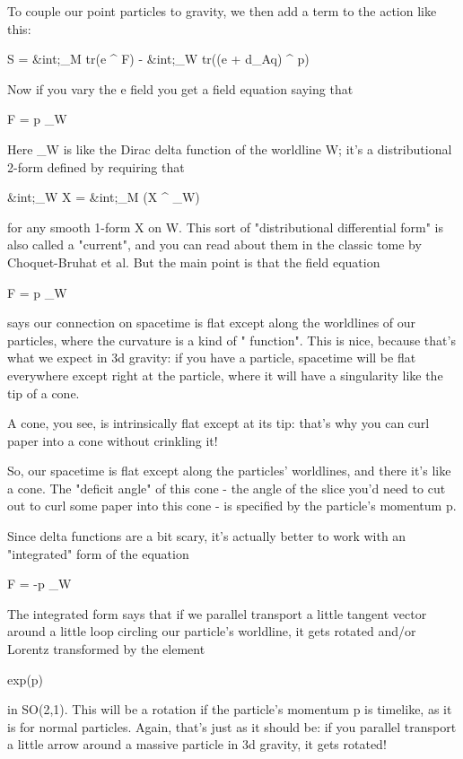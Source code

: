 To couple our point particles to gravity, we then add a term to 
the action like this:

S   =   &int;_{M}  tr(e ^ F)   -   
&int;_{W}  tr((e + d_{A}q) ^ p)

Now if you vary the e field you get a field equation saying that 

F = p \delta _{W}

Here \delta _{W} is like the Dirac delta function 
of the worldline W;
it's a distributional 2-form defined by requiring that

&int;_{W}  X   =  &int;_{M}  (X ^ \delta _{W}) 

for any smooth 1-form X on W.  This sort of "distributional
differential form" is also called a "current", and you
can read about them in the classic tome by Choquet-Bruhat et al.  But
the main point is that the field equation

F = p \delta _{W}

says our connection on spacetime is flat except along the worldlines
of our particles, where the curvature is a kind of "\delta 
function".  This is nice, because that's what we expect in 3d
gravity: if you have a particle, spacetime will be flat everywhere
except right at the particle, where it will have a singularity like
the tip of a cone.

A cone, you see, is intrinsically flat except at its tip: that's why 
you can curl paper into a cone without crinkling it!

So, our spacetime is flat except along the particles' worldlines, and
there it's like a cone.  The "deficit angle" of this cone -
the angle of the slice you'd need to cut out to curl some paper into
this cone - is specified by the particle's momentum p.

Since delta functions are a bit scary, it's actually better to work with 
an "integrated" form of the equation

F = -p \delta _{W}

The integrated form says that if we parallel transport a little tangent
vector around a little loop circling our particle's worldline, it gets
rotated and/or Lorentz transformed by the element

exp(p) 

in SO(2,1).  This will be a rotation if the particle's momentum p is 
timelike, as it is for normal particles.   Again, that's just as it 
should be: if you parallel transport a little arrow around a massive 
particle in 3d gravity, it gets rotated!

